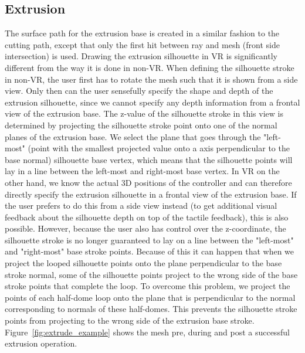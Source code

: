 \subsection{Extrusion}
The surface path for the extrusion base is created in a similar fashion to the cutting path, except that only the first hit between ray and mesh (front side intersection) is used.
Drawing the extrusion silhouette in VR is significantly different from the way it is done in non-VR. When defining the silhouette stroke in non-VR, the user first has to rotate the mesh such that it is shown from a side view. Only then can the user sensefully specify the shape and depth of the extrusion silhouette, since we cannot specify any depth information from a frontal view of the extrusion base. The z-value of the silhouette stroke in this view is determined by projecting the silhouette stroke point onto one of the normal planes of the extrusion base. We select the plane that goes through the "left-most" (point with the smallest projected value onto a axis perpendicular to the base normal) silhouette base vertex, which means that the silhouette points will lay in a line between the left-most and right-most base vertex. 
In VR on the other hand, we know the actual 3D positions of the controller and can therefore directly specify the extrusion silhouette in a frontal view of the extrusion base. If the user prefers to do this from a side view instead (to get additional visual feedback about the silhouette depth on top of the tactile feedback), this is also possible. However, because the user also has control over the z-coordinate, the silhouette stroke is no longer guaranteed to lay on a line between the "left-most" and "right-most" base stroke points. Because of this it can happen that when we project the looped silhouette points onto the plane perpendicular to the base stroke normal, some of the silhouette points project to the wrong side of the base stroke points that complete the loop. To overcome this problem, we project the points of each half-dome loop onto the plane that is perpendicular to the normal corresponding to normals of these half-domes. This prevents the silhouette stroke points from projecting to the wrong side of the extrusion base stroke. Figure~\ref{fig:extrude_example} shows the mesh pre, during and post a successful extrusion operation. 

